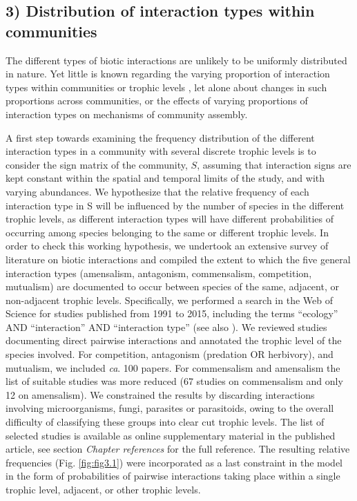 \subsection*{3) Distribution of interaction types within communities }

The different types of biotic interactions are unlikely to be uniformly distributed in nature. Yet little is known regarding the varying proportion of interaction types within communities or trophic levels \citep{Dodds1997}, let alone about changes in such proportions across communities, or the effects of varying proportions of interaction types on mechanisms of community assembly.

A first step towards examining the frequency distribution of the different interaction types in a community with several discrete trophic levels is to consider the sign matrix of the community, $S$, assuming that interaction signs are kept constant within the spatial and temporal limits of the study, and with varying abundances. We hypothesize that the relative frequency of each interaction type in S will be influenced by the number of species in the different trophic levels, as different interaction types will have different probabilities of occurring among species belonging to the same or different trophic levels. In order to check this working hypothesis, we undertook an extensive survey of literature on biotic interactions and compiled the extent to which the five general interaction types (amensalism, antagonism, commensalism, competition, mutualism) are documented to occur between species of the same, adjacent, or non-adjacent trophic levels. Specifically, we performed a search in the Web of Science for studies published from 1991 to 2015, including the terms “ecology” AND “interaction” AND “interaction type” (see also \citealt{Morales-Castilla2015}). We reviewed studies documenting direct pairwise interactions and annotated the trophic level of the species involved. For competition, antagonism (predation OR herbivory), and mutualism, we included \textit{ca}. 100 papers. For commensalism and amensalism the list of suitable studies was more reduced (67 studies on commensalism and only 12 on amensalism). We constrained the results by discarding interactions involving microorganisms, fungi, parasites or parasitoids, owing to the overall difficulty of classifying these groups into clear cut trophic levels. The list of selected studies is available as online supplementary material in the published article, see section \textit{Chapter references} for the full reference. The resulting relative frequencies (Fig. \ref{fig:fig3.1}) were incorporated as a last constraint in the model in the form of probabilities of pairwise interactions taking place within a single trophic level, adjacent, or other trophic levels.

